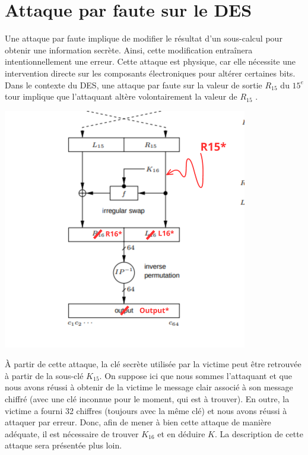 \documentclass[12pt,a4paper]{report}
\begin{document}
\newpage
\renewcommand{\thesection}{\arabic{section}}

\tableofcontents
\newpage
\section{Attaque par faute sur le DES}

Une attaque par faute implique de modifier le résultat d'un sous-calcul pour obtenir une information secrète. Ainsi, cette modification entraînera intentionnellement une erreur.
Cette attaque est physique, car elle nécessite une intervention directe sur les composants électroniques pour altérer certaines bits. Dans le contexte du DES, une attaque par faute sur la valeur de sortie $R_{15}$ du $15^{e}$ tour implique que l'attaquant altère volontairement la valeur de $R_{15}$ . 

\begin{center}\includegraphics[scale=1]{images/DES.png}
\end{center}

À partir de cette attaque, la clé secrète utilisée par la victime peut être retrouvée à partir de la sous-clé $K_{15}$. On suppose ici que nous sommes l'attaquant et que nous avons réussi à obtenir de la victime le message clair associé à son message chiffré (avec une clé inconnue pour le moment, qui est à trouver).  En outre, la victime a fourni 32 chiffres (toujours avec la même clé) et nous avons réussi à attaquer par erreur. Donc, afin de mener à bien cette attaque de manière adéquate, il est nécessaire de trouver $K_{16}$ et en déduire $K$. La description de cette attaque sera présentée plus loin.  
\end{document}
